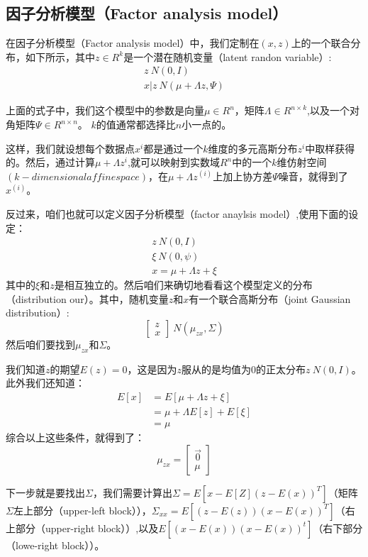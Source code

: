 \documentclass[14pt,a4paper]{article}
\begin{document}
\begin{spacing}{1.5}
\subsection{因子分析模型（Factor analysis model）}

在因子分析模型（Factor analysis model）中，我们定制在$(x,z)$上的一个联合分布，如下所示，其中$z\in R^{k}$是一个潜在随机变量（latent randon variable）:
$$
\begin{aligned}
z~N(0,I)  \\
x|z~N(\mu+\Lambda z,\Psi)
\end{aligned}
$$

上面的式子中，我们这个模型中的参数是向量$\mu\in R^{n}$，矩阵$\Lambda\in R^{n\times k}$,以及一个对角矩阵$\Psi\in R^{n\times n}$。 $k$的值通常都选择比$n$小一点的。

这样，我们就设想每个数据点$x^{i}$都是通过一个$k$维度的多元高斯分布$z^{i}$中取样获得的。然后，通过计算$\mu+\Lambda z^{i}$,就可以映射到实数域$R^{n}$中的一个$k$维仿射空间$(k-dimensional affine space)$，在$\mu+\Lambda z^{(i)}$上加上协方差$\Psi$噪音，就得到了$x^{(i)}$。

反过来，咱们也就可以定义因子分析模型（factor anaylsis model）,使用下面的设定：
$$
\begin{aligned}
& z~N(0,I)\\
& \xi~N(0,\psi)\\
& x=\mu+\Lambda z+\xi
& \end{aligned}
$$
其中的$\xi$和$z$是相互独立的。然后咱们来确切地看看这个模型定义的分布（distribution our）。其中，随机变量$z$和$x$有一个联合高斯分布（joint Gaussian distribution）:
$$
\begin{bmatrix}
z\\x
\end{bmatrix} ~N(\mu_{zx},\Sigma)
$$
然后咱们要找到$\mu_{zx}$和$\Sigma$。

我们知道$z$的期望$E(z)=0$，这是因为$z$服从的是均值为0的正太分布$z~N(0,I)$。此外我们还知道：
$$
\begin{aligned}
E[x]&=E[\mu+\Lambda z+\xi]\\
&=\mu+\Lambda E[z]+E[\xi]\\
&=\mu
\end{aligned}
$$
综合以上这些条件，就得到了：
$$
\mu_{zx}=\begin{bmatrix}
\vec{0} \\ \mu
\end{bmatrix}
$$

下一步就是要找出$\Sigma$，我们需要计算出$\Sigma=E[x-E[Z](z-E(x))^{T}]$（矩阵$\Sigma$左上部分（upper-left block）），$\Sigma_{xx}=E[(z-E(z))(x-E(x))^{T}]$（右上部分（upper-right block））,以及$E[(x-E(x))(x-E(x))^{t}]$（右下部分（lowe-right block））。


\end{spacing}
\end{document}
